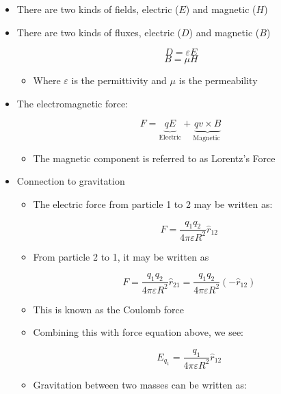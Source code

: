 \begin{itemize}

  \item There are two kinds of fields, electric ($E$) and magnetic ($H$)

  \item There are two kinds of fluxes, electric ($D$) and magnetic ($B$)

    $$\boxed{D=\varepsilon E}$$
    $$\boxed{B=\mu H}$$

    \begin{itemize}

      \item Where $\varepsilon$ is the permittivity and $\mu$ is the permeability

    \end{itemize}

  \item The electromagnetic force:

    $$F=\underbrace{qE}_\text{Electric}+\underbrace{qv\times B}_\text{Magnetic }$$

    \begin{itemize}

      \item The magnetic component is referred to as Lorentz's Force

    \end{itemize}

  \item Connection to gravitation

    \begin{itemize}

      \item The electric force from particle 1 to 2 may be written as:

        $$F=\frac{q_1q_2}{4\pi\varepsilon R^2}\hat{r}_{12}$$

      \item From particle 2 to 1, it may be written as

        $$F=\frac{q_1q_2}{4\pi\varepsilon R^2}\hat{r}_{21}=\frac{q_1q_2}{4\pi\varepsilon R^2}(-\hat{r}_{12})$$

      \item This is known as the Coulomb force

      \item Combining this with force equation above, we see:

        $$E_{q_1}=\frac{q_1}{4\pi\varepsilon R^2}\hat{r}_{12}$$

      \item Gravitation between two masses can be written as:


\end{itemize}
\end{itemize}
